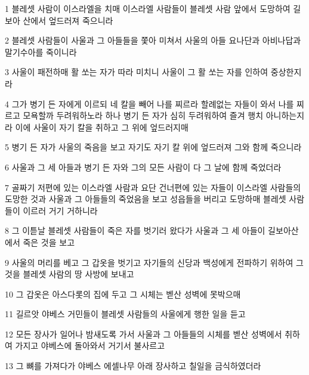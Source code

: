 \par 1 블레셋 사람이 이스라엘을 치매 이스라엘 사람들이 블레셋 사람 앞에서 도망하여 길보아 산에서 엎드러져 죽으니라
\par 2 블레셋 사람들이 사울과 그 아들들을 쫓아 미쳐서 사울의 아들 요나단과 아비나답과 말기수아를 죽이니라
\par 3 사울이 패전하매 활 쏘는 자가 따라 미치니 사울이 그 활 쏘는 자를 인하여 중상한지라
\par 4 그가 병기 든 자에게 이르되 네 칼을 빼어 나를 찌르라 할례없는 자들이 와서 나를 찌르고 모욕할까 두려워하노라 하나 병기 든 자가 심히 두려워하여 즐겨 행치 아니하는지라 이에 사울이 자기 칼을 취하고 그 위에 엎드러지매
\par 5 병기 든 자가 사울의 죽음을 보고 자기도 자기 칼 위에 엎드러져 그와 함께 죽으니라
\par 6 사울과 그 세 아들과 병기 든 자와 그의 모든 사람이 다 그 날에 함께 죽었더라
\par 7 골짜기 저편에 있는 이스라엘 사람과 요단 건너편에 있는 자들이 이스라엘 사람들의 도망한 것과 사울과 그 아들들의 죽었음을 보고 성읍들을 버리고 도망하매 블레셋 사람들이 이르러 거기 거하니라
\par 8 그 이튿날 블레셋 사람들이 죽은 자를 벗기러 왔다가 사울과 그 세 아들이 길보아산에서 죽은 것을 보고
\par 9 사울의 머리를 베고 그 갑옷을 벗기고 자기들의 신당과 백성에게 전파하기 위하여 그것을 블레셋 사람의 땅 사방에 보내고
\par 10 그 갑옷은 아스다롯의 집에 두고 그 시체는 벧산 성벽에 못박으매
\par 11 길르앗 야베스 거민들이 블레셋 사람들의 사울에게 행한 일을 듣고
\par 12 모든 장사가 일어나 밤새도록 가서 사울과 그 아들들의 시체를 벧산 성벽에서 취하여 가지고 야베스에 돌아와서 거기서 불사르고
\par 13 그 뼈를 가져다가 야베스 에셀나무 아래 장사하고 칠일을 금식하였더라


